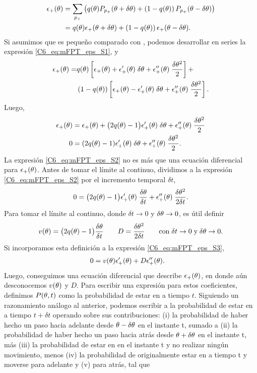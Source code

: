 \documentclass[./main.tex]{subfiles}
\begin{document}
\begin{align}
    \epsilon_{+}(\theta) &= \sum_{p_{+}} \left( q(\theta) P_{p_{+}}(\theta + \delta\theta) + \left(1-q(\theta)\right) P_{p_{+}}(\theta - \delta\theta) \right) \nonumber \\
    & = q(\theta) \epsilon_{+}(\theta+\delta\theta) +  \left(1-q(\theta)\right) \epsilon_{+}(\theta - \delta\theta) 
    \label{C6_eq:mFPT_eps_S1}.
\end{align}
Si asumimos que \deltax es pequeño comparado con \xx, podemos desarrollar en series la expresión \ref{C6_eq:mFPT_eps_S1}, y
\begin{align}
    \epsilon_{+}(\theta) = & q(\theta) \left[  \epsilon_{+}(\theta) + \epsilon_{+}'(\theta) \; \delta\theta + \epsilon_{+}''(\theta) \; \frac{\delta\theta^2}{2} \right] + \nonumber \\  & \left(1-q(\theta)\right) \left[  \epsilon_{+}(\theta) - \epsilon_{+}'(\theta) \; \delta\theta + \epsilon_{+}''(\theta) \; \frac{\delta\theta^2}{2} \right].
\end{align}
Luego,
\begin{align}
    \epsilon_{+}(\theta) &=  \epsilon_{+}(\theta) + \big(2q(\theta)-1\big) \epsilon_{+}'(\theta) \; \delta\theta + \epsilon_{+}''(\theta) \; \frac{\delta\theta^2}{2} \nonumber \\
    0 &=  (2q(\theta)-1) \epsilon_{+}'(\theta) \; \delta\theta + \epsilon_{+}''(\theta) \; \frac{\delta\theta^2}{2}. \label{C6_eq:mFPT_eps_S2}
\end{align}
La expresión \ref{C6_eq:mFPT_eps_S2} no es más que una ecuación diferencial para $\epsilon_{+}(\theta)$. Antes de tomar el límite al continuo, dividimos a la expresión \ref{C6_eq:mFPT_eps_S2} por el incremento temporal $\delta t$,
\begin{align}
     0 =  \big(2q(\theta)-1\big) \epsilon_{+}'(\theta) \; \frac{\delta\theta}{\delta t} + \epsilon_{+}''(\theta) \; \frac{\delta\theta^2}{2 \delta t}. 
     \label{C6_eq:mFPT_eps_S3}
\end{align}
Para tomar el límite al continuo, donde $\delta t \rightarrow   0 $ y $\delta\theta \rightarrow 0$, es útil definir
\begin{equation}
    v(\theta) = \big(2q(\theta)-1\big) \frac{\delta\theta}{\delta t} \qquad D = \frac{\delta\theta^2}{2 \delta t} \qquad \text{con} \; \delta t \rightarrow   0 \; \text{y} \; \delta\theta \rightarrow 0 .
    \label{C6_eq:mFPT_eps_def_vD}
\end{equation}
Si incorporamos esta definición a la expresión \ref{C6_eq:mFPT_eps_S3},
\begin{align}
     0 &=  v(\theta) \epsilon_{+}'(\theta) + D \epsilon_{+}''(\theta) .
     \label{C6_eq:mFPT_eps_S4}
\end{align}
Luego, conseguimos una ecuación diferencial que describe $\epsilon_{+}(\theta)$, en donde aún desconocemos $v(\theta)$ y $D$. Para escribir una expresión para estos coeficientes, definimos $P(\theta,t)$ como la probabilidad de estar en \xx a tiempo $t$. Siguiendo un razonamiento análogo al anterior, podemos escribir a la probabilidad de estar en \xx a tiempo $t+\delta t$ operando sobre sus contribuciones: (i) la probabilidad de haber hecho un paso hacia adelante desde $\theta-\delta\theta$ en el instante t, sumado a (ii) la probabilidad de haber hecho un paso hacia atrás desde $\theta+\delta\theta$ en el instante t, más (iii) la probabilidad de estar en \xx en el instante t y no realizar ningún movimiento, menos (iv) la probabilidad de originalmente estar en \xx a tiempo t y moverse para adelante y (v) para atrás, tal que 
\end{document}
